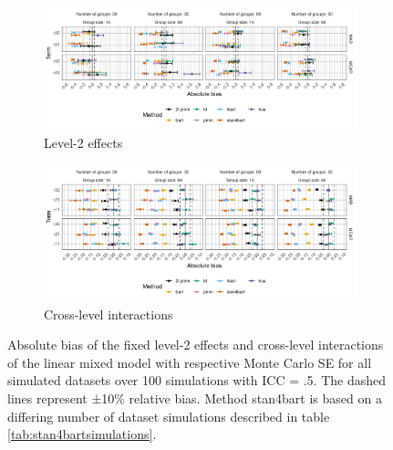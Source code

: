 \documentclass[3p,12pt,a4paper]{elsarticle}
\begin{document}
\begin{figure}[H]
    \centering 
    \begin{subfigure}[b]{1\textwidth}
        \centering
        \includegraphics[width=1\textwidth]{biaslevel2.png}
        \caption{Level-2 effects}
        \label{fig:biaslevel2}
    \end{subfigure}
    \begin{subfigure}[b]{1\textwidth}
        \centering
        \includegraphics[width=1\textwidth]{biascrosslevel.png}
        \caption{Cross-level interactions}
        \label{fig:biascrosslevel}
    \end{subfigure}
    \caption{Absolute bias of the fixed level-2 effects and cross-level interactions of the linear mixed model with respective Monte Carlo SE for all simulated datasets over 100 simulations with ICC = .5. The dashed lines represent ±10\% relative bias. Method stan4bart is based on a differing number of dataset simulations described in table \ref{tab:stan4bartsimulations}.}
    \label{fig:biaslevel2crosslevel}
\end{figure}
\end{document}
